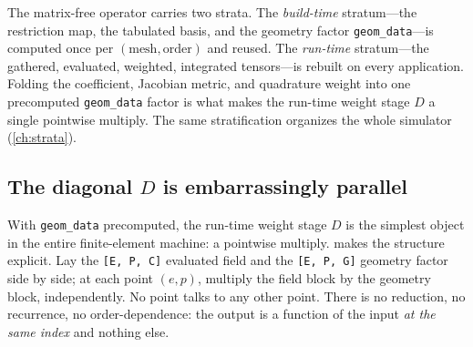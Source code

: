 \begin{keyidea}
The matrix-free operator carries two strata. The \emph{build-time} stratum---the
restriction map, the tabulated basis, and the geometry factor
\texttt{geom\_data}---is computed once per $(\text{mesh},\text{order})$ and
reused. The \emph{run-time} stratum---the gathered, evaluated, weighted,
integrated tensors---is rebuilt on every application. Folding the coefficient,
Jacobian metric, and quadrature weight into one precomputed \texttt{geom\_data}
factor is what makes the run-time weight stage $D$ a single pointwise multiply.
The same stratification organizes the whole simulator (\cref{ch:strata}).
\end{keyidea}

\subsection{The diagonal $D$ is embarrassingly parallel}
\label{sec:mf-diagonal}

With \texttt{geom\_data} precomputed, the run-time weight stage $D$ is the
simplest object in the entire finite-element machine: a pointwise multiply.
 makes the structure explicit. Lay the
\lstinline[style=l4style]|[E, P, C]| evaluated field and the
\lstinline[style=l4style]|[E, P, G]| geometry factor side by side; at each point
$(e,p)$, multiply the field block by the geometry block, independently. No point
talks to any other point. There is no reduction, no recurrence, no
order-dependence: the output is a function of the input \emph{at the same index}
and nothing else.

